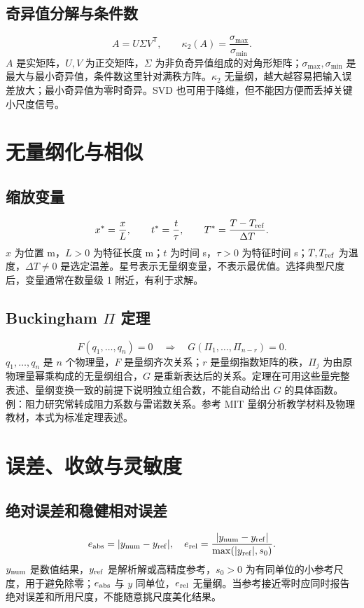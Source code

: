 \subsection{奇异值分解与条件数}
\begin{equation}A=U\Sigma V^\mathsf T,\qquad \kappa_2(A)=\frac{\sigma_{\max}}{\sigma_{\min}}.\end{equation}
$A$ 是实矩阵，$U,V$ 为正交矩阵，$\Sigma$ 为非负奇异值组成的对角形矩阵；$\sigma_{\max},\sigma_{\min}$ 是最大与最小奇异值，条件数这里针对满秩方阵。$\kappa_2$ 无量纲，越大越容易把输入误差放大；最小奇异值为零时奇异。SVD 也可用于降维，但不能因方便而丢掉关键小尺度信号。

\section{无量纲化与相似}
\subsection{缩放变量}
\begin{equation}x^*=\frac{x}{L},\qquad t^*=\frac{t}{\tau},\qquad T^*=\frac{T-T_{\rm ref}}{\Delta T}.\end{equation}
$x$ 为位置 m，$L>0$ 为特征长度 m；$t$ 为时间 s，$\tau>0$ 为特征时间 s；$T,T_{\rm ref}$ 为温度，$\Delta T\ne0$ 是选定温差。星号表示无量纲变量，不表示最优值。选择典型尺度后，变量通常在数量级 1 附近，有利于求解。
\subsection{Buckingham $\Pi$ 定理}
\begin{equation}F(q_1,\ldots,q_n)=0\quad\Longrightarrow\quad G(\Pi_1,\ldots,\Pi_{n-r})=0.\end{equation}
$q_1,\ldots,q_n$ 是 $n$ 个物理量，$F$ 是量纲齐次关系；$r$ 是量纲指数矩阵的秩，$\Pi_j$ 为由原物理量幂乘构成的无量纲组合，$G$ 是重新表达后的关系。定理在可用这些量完整表述、量纲变换一致的前提下说明独立组合数，不能自动给出 $G$ 的具体函数。例：阻力研究常转成阻力系数与雷诺数关系。参考 MIT 量纲分析教学材料及物理教材，本式为标准定理表述。

\section{误差、收敛与灵敏度}
\subsection{绝对误差和稳健相对误差}
\begin{equation}e_{\rm abs}=|y_{\rm num}-y_{\rm ref}|,\quad e_{\rm rel}=\frac{|y_{\rm num}-y_{\rm ref}|}{\max(|y_{\rm ref}|,s_0)}.\end{equation}
$y_{\rm num}$ 是数值结果，$y_{\rm ref}$ 是解析解或高精度参考，$s_0>0$ 为有同单位的小参考尺度，用于避免除零；$e_{\rm abs}$ 与 $y$ 同单位，$e_{\rm rel}$ 无量纲。当参考接近零时应同时报告绝对误差和所用尺度，不能随意挑尺度美化结果。
